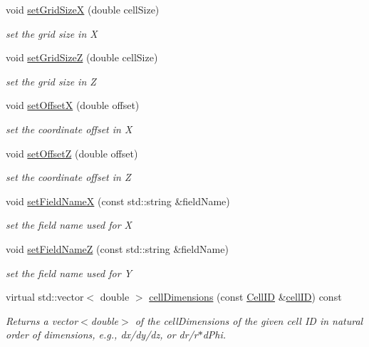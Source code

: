 \begin{DoxyCompactItemize}
void \hyperlink{class_d_d4hep_1_1_d_d_segmentation_1_1_cartesian_grid_x_z_af1370288c6bf2194666a6faa4f6bd563}{set\+Grid\+SizeX} (double cell\+Size)
\begin{DoxyCompactList}\small\item\em set the grid size in X \end{DoxyCompactList}\item 
void \hyperlink{class_d_d4hep_1_1_d_d_segmentation_1_1_cartesian_grid_x_z_aaef2c9c85c9d1325ab98690f33793ce1}{set\+Grid\+SizeZ} (double cell\+Size)
\begin{DoxyCompactList}\small\item\em set the grid size in Z \end{DoxyCompactList}\item 
void \hyperlink{class_d_d4hep_1_1_d_d_segmentation_1_1_cartesian_grid_x_z_abc7142a9cda0a6eb682d4eea9e5eae7a}{set\+OffsetX} (double offset)
\begin{DoxyCompactList}\small\item\em set the coordinate offset in X \end{DoxyCompactList}\item 
void \hyperlink{class_d_d4hep_1_1_d_d_segmentation_1_1_cartesian_grid_x_z_a45d273f0fcb485427d30c465477f4c61}{set\+OffsetZ} (double offset)
\begin{DoxyCompactList}\small\item\em set the coordinate offset in Z \end{DoxyCompactList}\item 
void \hyperlink{class_d_d4hep_1_1_d_d_segmentation_1_1_cartesian_grid_x_z_a2d1d365c962d662e90e53f07980bee2c}{set\+Field\+NameX} (const std\+::string \&field\+Name)
\begin{DoxyCompactList}\small\item\em set the field name used for X \end{DoxyCompactList}\item 
void \hyperlink{class_d_d4hep_1_1_d_d_segmentation_1_1_cartesian_grid_x_z_a46cc52729cf997b7e0ba497b43476fe2}{set\+Field\+NameZ} (const std\+::string \&field\+Name)
\begin{DoxyCompactList}\small\item\em set the field name used for Y \end{DoxyCompactList}\item 
virtual std\+::vector$<$ double $>$ \hyperlink{class_d_d4hep_1_1_d_d_segmentation_1_1_cartesian_grid_x_z_adfed73ee8d0122abe3dd014e6f14cfd3}{cell\+Dimensions} (const \hyperlink{namespace_d_d4hep_1_1_d_d_segmentation_ac7af071d85cb48820914434a07e21ba1}{Cell\+ID} \&\hyperlink{class_d_d4hep_1_1_d_d_segmentation_1_1_cartesian_grid_x_z_a78be61402af91066cf8e5048ed5441c5}{cell\+ID}) const
\begin{DoxyCompactList}\small\item\em Returns a vector$<$double$>$ of the cell\+Dimensions of the given cell ID in natural order of dimensions, e.\+g., dx/dy/dz, or dr/r$\ast$d\+Phi. \end{DoxyCompactList}\end{DoxyCompactItemize}

